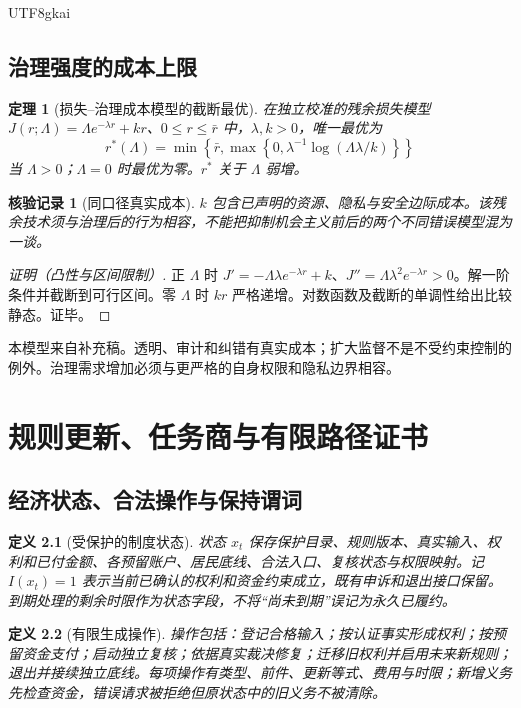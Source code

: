 \documentclass[12pt,a4paper,openany]{report}
\newtheorem{definition}{定义}[chapter]
\newtheorem{theorem}{定理}[chapter]
\newtheorem{Certificate}{核验记录}[chapter]
\begin{document}
\begin{CJK*}{UTF8}{gkai}
\section{治理强度的成本上限}
\begin{theorem}[损失--治理成本模型的截断最优]
\label{thm:audit-cost}
在独立校准的残余损失模型 $J(r;\Lambda)=\Lambda e^{-\lambda r}+kr$、$0\le r\le\bar r$ 中，$\lambda,k>0$，唯一最优为
\[
 r^*(\Lambda)=\min\left\{\bar r,\max\left\{0,
 \lambda^{-1}\log(\Lambda\lambda/k)\right\}\right\}
\]
当 $\Lambda>0$；$\Lambda=0$ 时最优为零。$r^*$ 关于 $\Lambda$ 弱增。
\end{theorem}
\begin{Certificate}[同口径真实成本]
$k$ 包含已声明的资源、隐私与安全边际成本。该残余技术须与治理后的行为相容，不能把抑制机会主义前后的两个不同错误模型混为一谈。
\end{Certificate}
\begin{proof}[证明（凸性与区间限制）]
正 $\Lambda$ 时 $J'=-\Lambda\lambda e^{-\lambda r}+k$、$J''=\Lambda\lambda^2e^{-\lambda r}>0$。解一阶条件并截断到可行区间。零 $\Lambda$ 时 $kr$ 严格递增。对数函数及截断的单调性给出比较静态。证毕。
\end{proof}
本模型来自补充稿\cite{SourceSupplement}。透明、审计和纠错有真实成本；扩大监督不是不受约束控制的例外。治理需求增加必须与更严格的自身权限和隐私边界相容。
\chapter{规则更新、任务商与有限路径证书}
\label{chap:dynamics}
\section{经济状态、合法操作与保持谓词}
\begin{definition}[受保护的制度状态]
\label{def:state}
状态 $x_t$ 保存保护目录、规则版本、真实输入、权利和已付金额、各预留账户、居民底线、合法入口、复核状态与权限映射。记 $I(x_t)=1$ 表示当前已确认的权利和资金约束成立，既有申诉和退出接口保留。到期处理的剩余时限作为状态字段，不将“尚未到期”误记为永久已履约。
\end{definition}

\begin{definition}[有限生成操作]
\label{def:operations}
操作包括：登记合格输入；按认证事实形成权利；按预留资金支付；启动独立复核；依据真实裁决修复；迁移旧权利并启用未来新规则；退出并接续独立底线。每项操作有类型、前件、更新等式、费用与时限；新增义务先检查资金，错误请求被拒绝但原状态中的旧义务不被清除。
\end{definition}


\end{CJK*}
\end{document}
